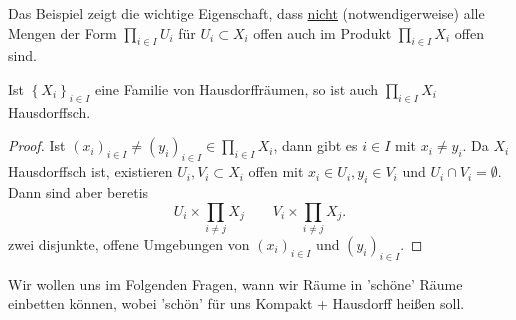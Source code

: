 \begin{remark*}
    Das Beispiel zeigt die wichtige Eigenschaft, dass \underline{nicht} (notwendigerweise) alle Mengen der Form $\prod_{i \in I}U_i$ für $U_i\subset X_i$ offen auch im Produkt $\prod_{i \in I}X_i$ offen sind.
\end{remark*}

\begin{theorem}\label{thm:produkte-von-Hausdorff-Räumen-sind-Hausdorff}
    Ist $\left \{X_i\right\} _{i \in I}$ eine Familie von Hausdorffräumen, so ist auch  $\prod _{i \in I} X_i$ Hausdorffsch.
\end{theorem}
\begin{proof}
    Ist $(x_i)_{i \in I} \neq  (y_i)_{i \in I} \in  \prod _{i \in I}X_i$, dann gibt es $i\in I$ mit $x_i \neq  y_i$. Da $X_i$ Hausdorffsch ist, existieren  $U_i, V_i \subset X_i$ offen mit $x_i \in U_i, y_i \in V_i$ und $U_i \cap  V_i = \emptyset$. Dann sind aber beretis
    \[
    U_i \times  \prod_{i\neq j} X_j \qquad V_i \times \prod_{i\neq j} X_j
    .\] 
    zwei disjunkte, offene Umgebungen von $(x_i)_{i \in I}$ und $(y_i)_{i \in I}$.
\end{proof}

\begin{goal*}
    Wir wollen uns im Folgenden Fragen, wann wir Räume in 'schöne' Räume einbetten können, wobei 'schön' für uns Kompakt + Hausdorff heißen soll.
\end{goal*}

